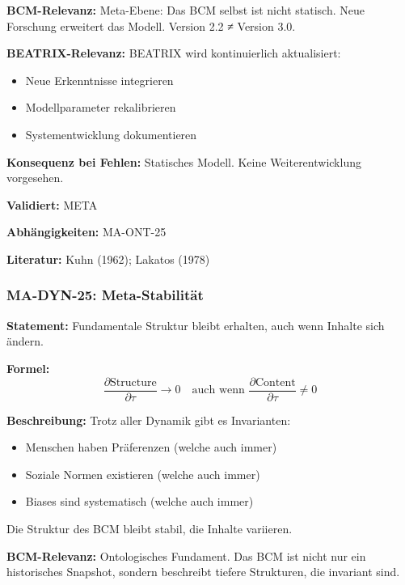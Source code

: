 \textbf{BCM-Relevanz:}
Meta-Ebene: Das BCM selbst ist nicht statisch. Neue Forschung erweitert das Modell. Version 2.2 ≠ Version 3.0.

\textbf{BEATRIX-Relevanz:}
BEATRIX wird kontinuierlich aktualisiert:
\begin{itemize}
    \item Neue Erkenntnisse integrieren
    \item Modellparameter rekalibrieren
    \item Systementwicklung dokumentieren
\end{itemize}

\textbf{Konsequenz bei Fehlen:}
Statisches Modell. Keine Weiterentwicklung vorgesehen.

\textbf{Validiert:} META

\textbf{Abhängigkeiten:} MA-ONT-25

\textbf{Literatur:} Kuhn (1962); Lakatos (1978)


\subsubsection*{MA-DYN-25: Meta-Stabilität}

\textbf{Statement:} Fundamentale Struktur bleibt erhalten, auch wenn Inhalte sich ändern.

\textbf{Formel:}
\begin{equation}
\frac{\partial \text{Structure}}{\partial \tau} \rightarrow 0 \quad \text{auch wenn } \frac{\partial \text{Content}}{\partial \tau} \neq 0
\end{equation}

\textbf{Beschreibung:}
Trotz aller Dynamik gibt es Invarianten:
\begin{itemize}
    \item Menschen haben Präferenzen (welche auch immer)
    \item Soziale Normen existieren (welche auch immer)
    \item Biases sind systematisch (welche auch immer)
\end{itemize}
Die Struktur des BCM bleibt stabil, die Inhalte variieren.

\textbf{BCM-Relevanz:}
Ontologisches Fundament. Das BCM ist nicht nur ein historisches Snapshot, sondern beschreibt tiefere Strukturen, die invariant sind.

